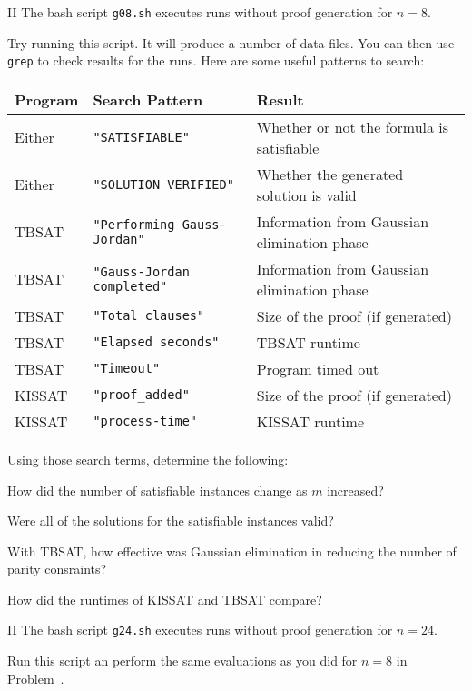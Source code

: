 \begin{problem}{II}
The bash script \texttt{g08.sh} executes runs without proof generation
for $n=8$.

Try running this script.  It will produce a number of data files.  You
can then use \texttt{grep} to check results for the runs.  Here are some useful patterns to search:
\begin{center}
\begin{tabular}{lll}
\toprule
Program & Search Pattern & Result \\
\midrule
Either & \texttt{"SATISFIABLE"} & Whether or not the formula is satisfiable \\
Either & \texttt{"SOLUTION VERIFIED"} & Whether the generated solution is valid \\
\midrule
TBSAT & \texttt{"Performing Gauss-Jordan"} & Information from Gaussian elimination phase \\
TBSAT & \texttt{"Gauss-Jordan completed"} & Information from Gaussian elimination phase \\
TBSAT & \texttt{"Total clauses"} & Size of the proof (if generated) \\
TBSAT & \texttt{"Elapsed seconds"} & TBSAT runtime \\
TBSAT & \texttt{"Timeout"} & Program timed out \\
\midrule
KISSAT & \texttt{"proof\_added"} & Size of the proof (if generated) \\
KISSAT & \texttt{"process-time"} & KISSAT runtime \\
\bottomrule
\end{tabular}
\end{center}

Using those search terms, determine the following:
\begin{choice}
\item How did the number of satisfiable instances change as $m$ increased?
\item Were all of the solutions for the satisfiable instances valid?
\item With TBSAT, how effective was Gaussian elimination in reducing the number of parity consraints?
\item How did the runtimes of KISSAT and TBSAT compare?
\end{choice}
\end{problem}

\newpage

\begin{problem}{II}
The bash script \texttt{g24.sh} executes runs without proof generation
for $n=24$.

Run this script an perform the same evaluations as you did for $n=8$ in Problem~.
\end{problem}

